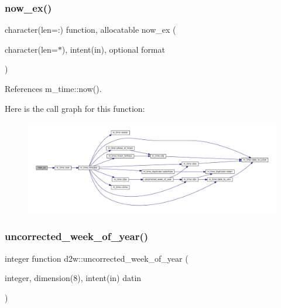 \subsubsection{\texorpdfstring{now\+\_\+ex()}{now\_ex()}}
{\footnotesize\ttfamily character(len=\+:) function, allocatable now\+\_\+ex (\begin{DoxyParamCaption}\item[{character(len=$\ast$), intent(in), optional}]{format }\end{DoxyParamCaption})\hspace{0.3cm}{\ttfamily [private]}}



References m\+\_\+time\+::now().

Here is the call graph for this function\+:\nopagebreak
\begin{figure}[H]
\begin{center}
\leavevmode
\includegraphics[width=350pt]{M__time_8f90_a09223e2da0c23850fad035407582fd68_cgraph}
\end{center}
\end{figure}
\mbox{\label{M__time_8f90_a4a68c5e906616f64da0c3d165fc41479}} 
\subsubsection{\texorpdfstring{uncorrected\+\_\+week\+\_\+of\+\_\+year()}{uncorrected\_week\_of\_year()}}
{\footnotesize\ttfamily integer function d2w\+::uncorrected\+\_\+week\+\_\+of\+\_\+year (\begin{DoxyParamCaption}\item[{integer, dimension(8), intent(in)}]{datin }\end{DoxyParamCaption})\hspace{0.3cm}{\ttfamily [private]}}



